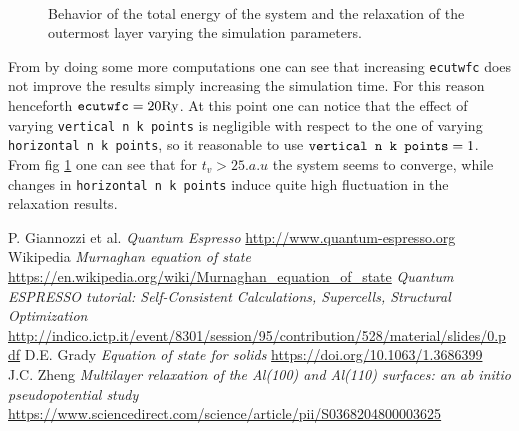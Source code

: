 \documentclass[a4paper, 11pt]{article}
\begin{document}
  \begin{figure}[H]
    \centering
     \\
    \caption{Behavior of the total energy of the system and the relaxation of the outermost layer varying the simulation parameters.}
    \label{fig:nl5_tuning}
  \end{figure}

  From by doing some more computations one can see that increasing \verb|ecutwfc| does not improve the results simply increasing the simulation time. For this reason henceforth $\verb|ecutwfc| = 20 \si{.Ry}$. At this point one can notice that the effect of varying \verb|vertical n k points| is negligible with respect to the one of varying \verb|horizontal n k points|, so it reasonable to use $\verb|vertical n k points| = 1$.
  From fig \ref{fig:nl5_tuning} one can see that for $t_v > 25 \si{.a.u}$ the system seems to converge, while changes in \verb|horizontal n k points| induce quite high fluctuation in the relaxation results.








\begin{thebibliography}{100}
   P. Giannozzi et al. \emph{Quantum Espresso}  \url{http://www.quantum-espresso.org}
   Wikipedia \emph{Murnaghan equation of state}  \url{https://en.wikipedia.org/wiki/Murnaghan_equation_of_state}
    \emph{Quantum ESPRESSO tutorial:  Self-Consistent Calculations, Supercells, Structural Optimization}  \url{http://indico.ictp.it/event/8301/session/95/contribution/528/material/slides/0.pdf}
   D.E. Grady \emph{Equation of state for solids}  \url{https://doi.org/10.1063/1.3686399}
   J.C. Zheng \emph{Multilayer  relaxation  of  the  Al(100)  and  Al(110)  surfaces: an  ab  initio  pseudopotential  study}  \url{https://www.sciencedirect.com/science/article/pii/S0368204800003625}
\end{thebibliography}
\end{document}
